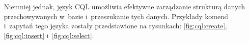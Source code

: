 Niemniej jednak, język CQL umożliwia efektywne zarządzanie strukturą danych przechowywanych w~bazie i~przeszukanie tych danych.
Przykłady komend i~zapytań tego języka zostały przedstawione na rysunkach: \ref{fig:cql:create}, \ref{fig:cql:insert} i~\ref{fig:cql:select}.






